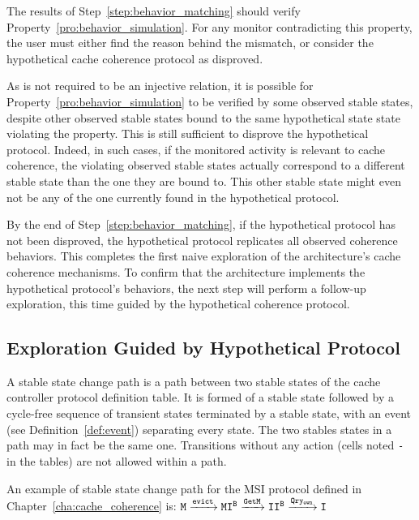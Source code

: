 The results of Step~\ref{step:behavior_matching} should verify
Property~\ref{pro:behavior_simulation}. For any monitor contradicting this
property, the user must either find the reason behind the mismatch, or consider
the hypothetical cache coherence protocol as disproved.

As \decodefun{} is not required to be an injective relation, it is possible for
Property~\ref{pro:behavior_simulation} to be verified by some observed stable
states, despite other observed stable states bound to the same hypothetical
state state violating the property. This is still sufficient to disprove the
hypothetical protocol. Indeed, in such cases, if the monitored activity is
relevant to cache coherence, the violating observed stable states actually
correspond to a different stable state than the one they are bound to. This
other stable state might even not be any of the one currently found in the
hypothetical protocol.

By the end of Step~\ref{step:behavior_matching}, if the hypothetical protocol
has not been disproved, the hypothetical protocol replicates all observed
coherence behaviors. This completes the first naive exploration of the
architecture's cache coherence mechanisms. To confirm that the architecture
implements the hypothetical protocol's behaviors, the next step will perform a
follow-up exploration, this time guided by the hypothetical coherence protocol.

\subsection{Exploration Guided by Hypothetical Protocol}
\begin{definition}
\label{def:stable_state_change_path}
A stable state change path is a path between two stable states of the
cache controller protocol definition table. It is formed of a stable state
followed by a cycle-free sequence of transient states terminated
by a stable state, with an event (see Definition~\ref{def:event}) separating
every state. The two stables states in a path may in fact be the same one.
Transitions without any action (cells noted \lstinline!-! in the tables)
are not allowed within a path.
\end{definition}
\begin{example}
An example of stable state change path for the MSI protocol defined in
Chapter~\ref{cha:cache_coherence} is:
$\texttt{M} \xrightarrow[]{\text{\texttt{evict}}{}}
\texttt{MI}^\texttt{B} \xrightarrow[]{\text{\texttt{GetM}}{}}
\texttt{II}^\texttt{B} \xrightarrow[]{\text{\texttt{Qry\textsubscript{own}}}{}}
\texttt{I}$
\end{example}

